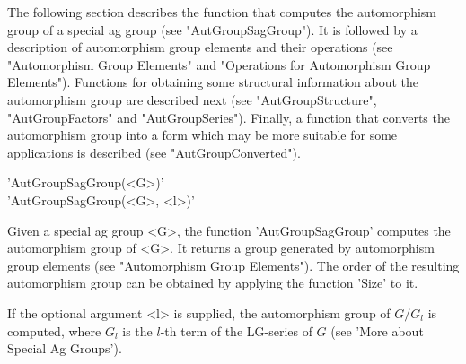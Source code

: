 The  following section describes  the function that  computes the automorphism
group  of a  special ag  group (see  "AutGroupSagGroup"). It  is followed by a
description   of  automorphism  group  elements   and  their  operations  (see
"Automorphism   Group  Elements"   and  "Operations   for  Automorphism  Group
Elements").  Functions  for  obtaining  some  structural information about the
automorphism    group   are    described   next    (see   "AutGroupStructure",
"AutGroupFactors" and "AutGroupSeries"). Finally, a function that converts the
automorphism   group  into  a  form  which  may  be  more  suitable  for  some
applications is described (see "AutGroupConverted").


'AutGroupSagGroup(<G>)' \\ 
'AutGroupSagGroup(<G>, <l>)'


Given  a special  ag group  <G>, the  function 'AutGroupSagGroup' computes the
automorphism  group of <G>. It returns a group generated by automorphism group
elements  (see  "Automorphism  Group  Elements").  The  order of the resulting
automorphism group can be obtained by applying the function 'Size' to it.

If the optional argument <l> is supplied, the automorphism group of $G/G_l$ is
computed, where $G_l$ is the $l$-th term of the LG-series of $G$ (see 'More
about Special Ag Groups').

